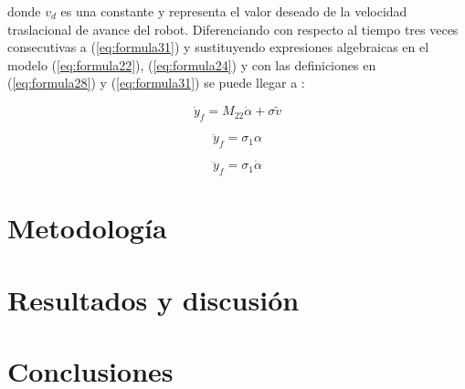 \documentclass[11pt, twoside]{book}     %
\begin{document}
            \noindent donde $v_d$ es una constante y representa el valor deseado de la velocidad traslacional de avance del robot. Diferenciando con respecto al tiempo tres veces consecutivas a  (\ref{eq:formula31}) y sustituyendo expresiones algebraicas en el modelo (\ref{eq:formula22}), (\ref{eq:formula24}) y con las definiciones en (\ref{eq:formula28}) y (\ref{eq:formula31}) se puede llegar a \citep{VMHGuzmancontrol2013}:

            \begin{equation}
                \dot{y}_f= M_{22}\dot{\alpha}+\sigma\tilde{v}
                \label{eq:formula32}
            \end{equation}

            \begin{equation}
                \ddot{y}_f=\sigma_1\alpha
                \label{eq:formula33}
            \end{equation}

            \begin{equation}
                \dddot{y}_f=\sigma_1\dot{\alpha}
                \label{eq:formula34}
            \end{equation}
        
    \chapter{Metodología}
            
    \chapter{Resultados y discusión}

    \chapter{Conclusiones}
        

\end{document}
